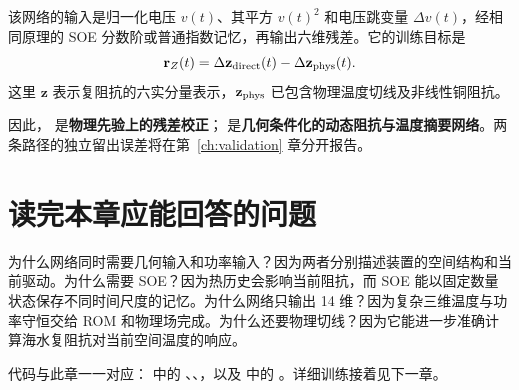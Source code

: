 该网络的输入是归一化电压 $v(t)$、其平方 $v(t)^2$ 和电压跳变量 $\Delta v(t)$，经相同原理的 SOE 分数阶或普通指数记忆，再输出六维残差。它的训练目标是
\[
\mathbf r_Z(t)=
\Delta\mathbf z_{\rm direct}(t)
-\Delta\mathbf z_{\rm phys}(t).
\]
这里 $\mathbf z$ 表示复阻抗的六实分量表示，$\mathbf z_{\rm phys}$ 已包含物理温度切线及非线性铜阻抗。

因此， 是\textbf{物理先验上的残差校正}； 是\textbf{几何条件化的动态阻抗与温度摘要网络}。两条路径的独立留出误差将在第~\ref{ch:validation} 章分开报告。

\section{读完本章应能回答的问题}
为什么网络同时需要几何输入和功率输入？因为两者分别描述装置的空间结构和当前驱动。为什么需要 SOE？因为热历史会影响当前阻抗，而 SOE 能以固定数量状态保存不同时间尺度的记忆。为什么网络只输出 14 维？因为复杂三维温度与功率守恒交给 ROM 和物理场完成。为什么还要物理切线？因为它能进一步准确计算海水复阻抗对当前空间温度的响应。

代码与此章一一对应： 中的 、、，以及  中的 。详细训练接着见下一章。
